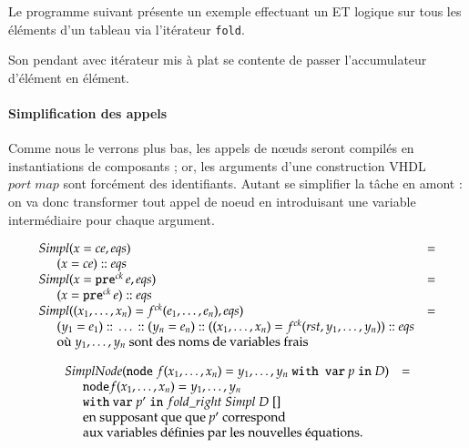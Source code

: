 \documentclass[9pt,a4paper]{article}
\newcommand{\mybox}[1]{\mbox{\tt{#1}}}
\newcommand{\ind}[0]{\hspace{0.5cm}}
\newcommand{\Cons}[0]{\; \mathbf{::} \;}
\newcommand{\Node}[4]{\mybox{node} \; f(#1) = #2 \; \mybox{with var} \
  #3 \; \mybox{in} \; #4}
\newcommand{\Pre}[1]{\mybox{pre}^{ck} \, #1}
\newcommand{\App}[2]{#1^{ck}(#2)}
\begin{document}
Le programme suivant présente un exemple effectuant un ET logique sur tous les
éléments d'un tableau via l'itérateur \texttt{fold}.



Son pendant avec itérateur mis à plat se contente de passer l'accumulateur
d'élément en élément.



\paragraph{Simplification des appels}

Comme nous le verrons plus bas, les appels de nœuds seront compilés en
instantiations de composants ; or, les arguments d'une construction VHDL $port
\; map$ sont forcément des identifiants. Autant se simplifier la tâche en amont
: on va donc transformer tout appel de noeud en introduisant une variable
intermédiaire pour chaque argument.

\newcommand{\simpl}[2]{Simpl(#1,#2)}
\newcommand{\simplnd}[1]{SimplNode(#1)}

\[
\begin{array}{ll}
  \simpl{x = ce}{eqs} & = \\
  \ind (x = ce) \Cons eqs \\
  \simpl{x = \Pre{e}}{eqs} & = \\
  \ind (x = \Pre{e}) \Cons eqs \\

  \simpl{(x_1,\dots,x_n) = \App{f}{e_1,\dots,e_n}}{eqs} & = \\
  \ind (y_1 = e_1) \Cons \dots \Cons (y_n = e_n)
  \Cons ((x_1,\dots,x_n) = \App{f}{rst,y_1,\dots,y_n}) \Cons eqs \\
  \ind \mbox{où } y_1,\dots,y_n \mbox{ sont des noms de variables frais}
\end{array}
\]

\[
\begin{array}{ll}
  \simplnd{\Node{x_1,\dots,x_n}{y_1,\dots,y_n}{p}{D}} & = \\
  \ind \mathtt{node} f(x_1,\dots,x_n) = y_1, \dots, y_n \; \\
  \ind \mathtt{with} \  \mathtt{var} \; p' \; \mathtt{in} \; fold\_right \;Simpl
  \; D \; [] \\
  \ind \mbox{en supposant que que } p' \mbox{ correspond} \\
  \ind \mbox{aux variables définies par les nouvelles équations.}
\end{array}
\]
\end{document}
